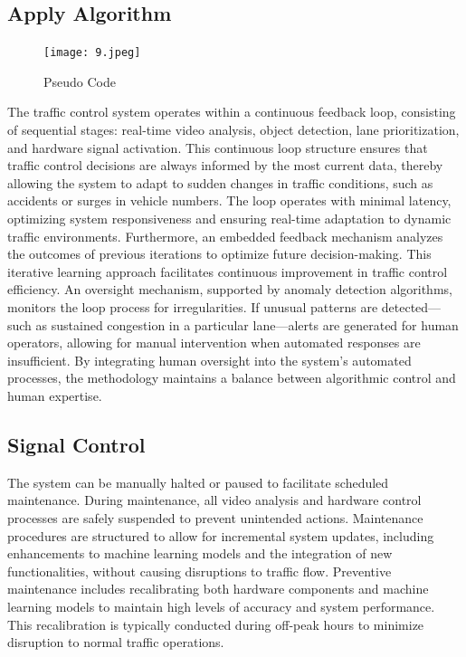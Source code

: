\documentclass[usenatbib]{tjaa}
\begin{document}
\subsection{Apply Algorithm}
\begin{figure}
    \centering
    \texttt{[image: 9.jpeg]}
    \caption{Pseudo Code}
    \label{fig:wrap1}
\end{figure}
The traffic control system operates within a continuous feedback loop, 
consisting of sequential stages: real-time video analysis, object detection, lane prioritization, and hardware signal activation. This continuous loop structure ensures that traffic control decisions are always informed by the most current data, thereby allowing the system to adapt to sudden changes in traffic conditions, such as accidents or surges in vehicle numbers.
The loop operates with minimal latency, optimizing system responsiveness and ensuring real-time adaptation to dynamic traffic environments. Furthermore, an embedded feedback mechanism analyzes the outcomes of previous iterations to optimize future decision-making. This iterative learning approach facilitates continuous improvement in traffic control efficiency. An oversight mechanism, supported by anomaly detection algorithms, monitors the loop process for irregularities. If unusual patterns are detected—such as sustained congestion in a particular lane—alerts are generated for human operators, allowing for manual intervention when automated responses are insufficient. By integrating human oversight into the system's automated processes, the methodology maintains a balance between algorithmic control and human expertise.



\subsection{Signal Control}
The system can be manually halted or paused to facilitate scheduled maintenance. During maintenance, all video analysis and hardware control processes are safely suspended to prevent unintended actions. Maintenance procedures are structured to allow for incremental system updates, including enhancements to machine learning models and the integration of new functionalities, without causing disruptions to traffic flow. Preventive maintenance includes recalibrating both hardware components and machine learning models to maintain high levels of accuracy and system performance. This recalibration is typically conducted during off-peak hours to minimize disruption to normal traffic operations.
\end{document}
